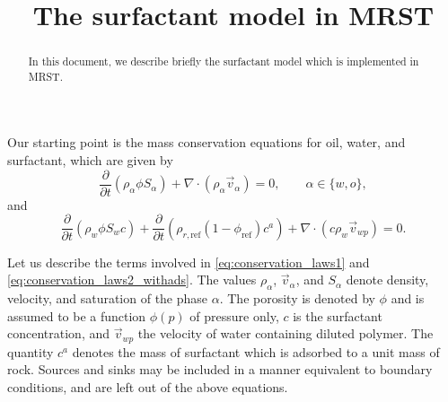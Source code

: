 \documentclass[11pt]{amsart}
\newcommand{\cads}{c^a}
\newcommand{\fracpar}[2]{\frac{\partial #1}{\partial #2}}
\begin{document}
\title[surfactant model]{The surfactant model in MRST}

\maketitle

\begin{abstract}
  In this document, we describe briefly the surfactant model which is implemented in MRST. 
\end{abstract}


Our starting point is the mass conservation equations for oil, water, and surfactant, which are given by
\begin{equation}
  \label{eq:conservation_laws1}
  \frac{\partial}{\partial t} (\rho_{\alpha}\phi S_\alpha) +
  \nabla\cdot(\rho_{\alpha}\vec{v}_\alpha)  = 0, \qquad \alpha\in\{w,o\}, 
\end{equation}
and
\begin{equation}
  \label{eq:conservation_laws2_withads}
  \frac{\partial}{\partial t} (\rho_{w}\phi S_w c)+
  \fracpar{}{t}\left(\rho_{r, \text{ref}}(1-\phi_\text{ref})\cads\right)+\nabla\cdot(c
  \rho_{w} \vec{v}_{wp})  = 0.
\end{equation}

Let us describe the terms involved in \eqref{eq:conservation_laws1} and
\eqref{eq:conservation_laws2_withads}. The values $\rho_{\alpha}$, $\vec{v}_\alpha$, and $S_\alpha$
denote density, velocity, and saturation of the phase $\alpha$. The porosity is denoted by $\phi$
and is assumed to be a function $\phi(p)$ of pressure only, $c$ is the surfactant concentration, and
$\vec{v}_{wp}$ the velocity of water containing diluted polymer. The quantity $c^a$ denotes the mass
of surfactant which is adsorbed to a unit mass of rock. Sources and sinks may be included in a
manner equivalent to boundary conditions, and are left out of the above equations.
\end{document}
